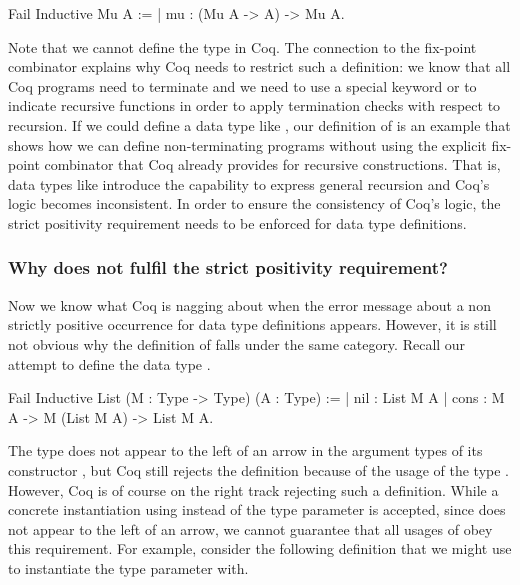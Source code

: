 \begin{coqcode}
Fail Inductive Mu A :=
| mu : (Mu A -> A) -> Mu A.
\end{coqcode}

Note that we cannot define the type  in Coq.
The connection to the fix\--point combinator explains why Coq needs to restrict such a definition: we know that all Coq programs need to terminate and we need to use a special keyword  or  to indicate recursive functions in order to apply termination checks with respect to recursion.
If we could define a data type like , our definition of  is an example that shows how we can define non\--terminating programs without using the explicit fix\--point combinator that Coq already provides for recursive constructions.
That is, data types like  introduce the capability to express general recursion and Coq's logic becomes inconsistent.
In order to ensure the consistency of Coq's logic, the strict positivity requirement needs to be enforced for data type definitions.

\subsubsection{Why does  not fulfil the strict positivity requirement?}

Now we know what Coq is nagging about when the error message about a non strictly positive occurrence for data type definitions appears.
However, it is still not obvious why the definition of  falls under the same category.
Recall our attempt to define the data type .

\begin{coqcode}
Fail Inductive List (M : Type -> Type) (A : Type) :=
| nil : List M A
| cons : M A -> M (List M A) -> List M A.
\end{coqcode}

The type  does not appear to the left of an arrow in the argument types of its constructor , but Coq still rejects the definition because of the usage of the type .
However, Coq is of course on the right track rejecting such a definition.
While a concrete instantiation using  instead of the type parameter  is accepted, since  does not appear to the left of an arrow, we cannot guarantee that all usages of  obey this requirement.
For example, consider the following definition that we might use to instantiate the type parameter with.

